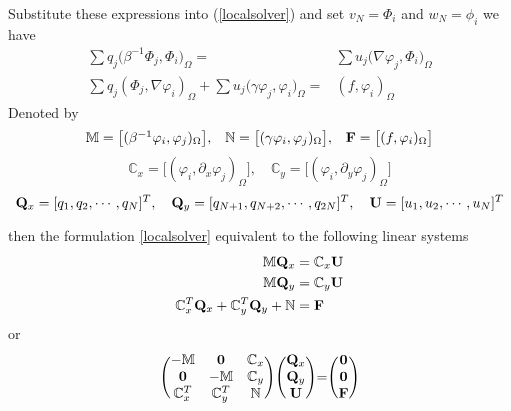 \documentclass[10pt,reqno, final]{amsart}
\newcommand{\bs}[1]{\boldsymbol{#1}}
\begin{document}
Substitute these expressions into (\ref{localsolver}) and set $v_N=\Phi_i$ and $w_N=\phi_i$ we have
\begin{equation}
\begin{split}
\sum q_j\big(\beta^{-1}\Phi_j, \Phi_i\big)_{\Omega}
=&\sum u_j\big(\nabla\varphi_j,\Phi_i\big)_{\Omega} \nonumber\\
\sum q_j(\Phi_j,\nabla\varphi_i)_{{\Omega}} + \sum u_j\big( \gamma\varphi_j,   \varphi_i\big)_{\Omega}
=&(f,\varphi_i)_{\Omega} \nonumber
\end{split}
\end{equation}
Denoted by
\begin{equation*}
\begin{array}{lll}
\mathbb{M}=\big[(\beta^{-1}\varphi_i, \varphi_j)_{{\Omega}}\big],
&\mathbb{N}=\big[(\gamma\varphi_i, \varphi_j)_{{\Omega}}\big],
&{\bf F}=\big[ (f,\varphi_i)_{\Omega} \big]
\end{array}
\end{equation*}
\begin{equation*}
 \mathbb{C}_x=\big[(\varphi_i, \partial_x\varphi_j)_{{\Omega}}\big], \quad  \mathbb{C}_y=\big[(\varphi_i, \partial_y\varphi_j)_{{\Omega}}\big]
\end{equation*}
\begin{equation*}
  {\bf Q}_x = [q_1,q_2,\cdots,q_N]^T, \quad  {\bf Q}_y = [q_{N+1},q_{N+2},\cdots,q_{2N}]^T, \quad  {\bf U} = [u_1, u_2,\cdots, u_N]^T
\end{equation*}

then the formulation \eqref{localsolver} equivalent to the following linear systems
\begin{equation}
\label{locallinearsys}
\begin{split}
\mathbb{M}  {\bf Q}_x &=  \mathbb{C}_x  {\bf U}\\
\mathbb{M}  {\bf Q}_y &=  \mathbb{C}_y  {\bf U}\\
 \mathbb{C}_x^T  {\bf Q}_x + \mathbb{C}_y^T  {\bf Q}_y  + \mathbb{N} &= {\bf F}
\end{split}
\end{equation}
or
\begin{equation*}
\Bigg(
  \begin{matrix}
  -\mathbb{M}     &  {\bs 0}        & \mathbb{C}_x   \\
   {\bs 0}&    -\mathbb{M}      &\mathbb{C}_y\\
     \mathbb{C}_x^T & \mathbb{C}_y^T  & {\mathbb{N}}\\
  \end{matrix}
  \Bigg)
\Bigg(
  \begin{matrix}
  {\bf Q}_x \\
  {\bf Q}_y \\
  {\bf U}
  \end{matrix}
  \Bigg)
  {=}
\Bigg(
  \begin{matrix}
  {\bf 0} \\
  {\bf 0} \\
  {\bf F}
  \end{matrix}
  \Bigg)
\end{equation*}
\end{document}
